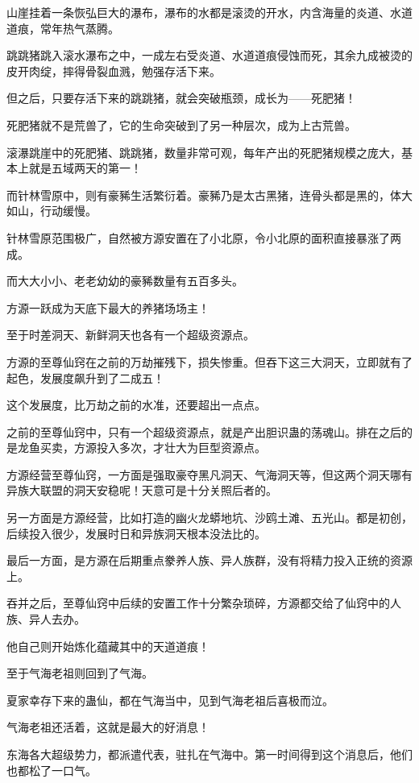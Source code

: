 \begin{this_body}
山崖挂着一条恢弘巨大的瀑布，瀑布的水都是滚烫的开水，内含海量的炎道、水道道痕，常年热气蒸腾。

跳跳猪跳入滚水瀑布之中，一成左右受炎道、水道道痕侵蚀而死，其余九成被烫的皮开肉绽，摔得骨裂血溅，勉强存活下来。

但之后，只要存活下来的跳跳猪，就会突破瓶颈，成长为——死肥猪！

死肥猪就不是荒兽了，它的生命突破到了另一种层次，成为上古荒兽。

滚瀑跳崖中的死肥猪、跳跳猪，数量非常可观，每年产出的死肥猪规模之庞大，基本上就是五域两天的第一！

而针林雪原中，则有豪豨生活繁衍着。豪豨乃是太古黑猪，连骨头都是黑的，体大如山，行动缓慢。

针林雪原范围极广，自然被方源安置在了小北原，令小北原的面积直接暴涨了两成。

而大大小小、老老幼幼的豪豨数量有五百多头。

方源一跃成为天底下最大的养猪场场主！

至于时差洞天、新鲜洞天也各有一个超级资源点。

方源的至尊仙窍在之前的万劫摧残下，损失惨重。但吞下这三大洞天，立即就有了起色，发展度飙升到了二成五！

这个发展度，比万劫之前的水准，还要超出一点点。

之前的至尊仙窍中，只有一个超级资源点，就是产出胆识蛊的荡魂山。排在之后的是龙鱼买卖，方源投入多次，才壮大为巨型资源点。

方源经营至尊仙窍，一方面是强取豪夺黑凡洞天、气海洞天等，但这两个洞天哪有异族大联盟的洞天安稳呢！天意可是十分关照后者的。

另一方面是方源经营，比如打造的幽火龙蟒地坑、沙鸥土滩、五光山。都是初创，后续投入很少，发展时日和异族洞天根本没法比的。

最后一方面，是方源在后期重点豢养人族、异人族群，没有将精力投入正统的资源上。

吞并之后，至尊仙窍中后续的安置工作十分繁杂琐碎，方源都交给了仙窍中的人族、异人去办。

他自己则开始炼化蕴藏其中的天道道痕！

至于气海老祖则回到了气海。

夏家幸存下来的蛊仙，都在气海当中，见到气海老祖后喜极而泣。

气海老祖还活着，这就是最大的好消息！

东海各大超级势力，都派遣代表，驻扎在气海中。第一时间得到这个消息后，他们也都松了一口气。


\end{this_body}
